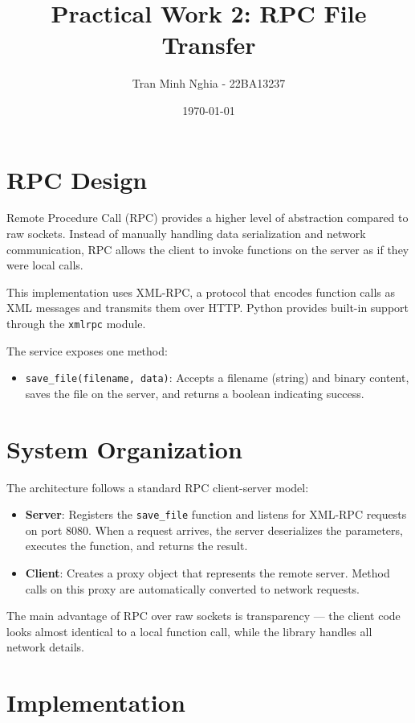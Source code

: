 \documentclass{article}
\title{Practical Work 2: RPC File Transfer}
\author{Tran Minh Nghia - 22BA13237}
\date{\today}
\begin{document}
\maketitle

\section{RPC Design}
Remote Procedure Call (RPC) provides a higher level of abstraction compared to raw sockets. Instead of manually handling data serialization and network communication, RPC allows the client to invoke functions on the server as if they were local calls.

This implementation uses XML-RPC, a protocol that encodes function calls as XML messages and transmits them over HTTP. Python provides built-in support through the \texttt{xmlrpc} module.

The service exposes one method:
\begin{itemize}
    \item \texttt{save\_file(filename, data)}: Accepts a filename (string) and binary content, saves the file on the server, and returns a boolean indicating success.
\end{itemize}

\section{System Organization}
The architecture follows a standard RPC client-server model:
\begin{itemize}
    \item \textbf{Server}: Registers the \texttt{save\_file} function and listens for XML-RPC requests on port 8080. When a request arrives, the server deserializes the parameters, executes the function, and returns the result.
    \item \textbf{Client}: Creates a proxy object that represents the remote server. Method calls on this proxy are automatically converted to network requests.
\end{itemize}

The main advantage of RPC over raw sockets is transparency --- the client code looks almost identical to a local function call, while the library handles all network details.

\section{Implementation}
\end{document}
